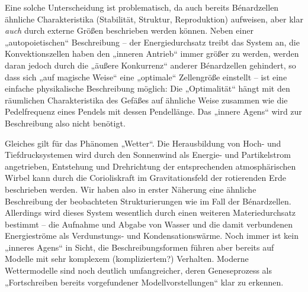 \documentclass[11pt,a4paper]{article}
\begin{document}
Eine solche Unterscheidung ist problematisch, da auch bereits
Bénardzellen ähnliche Charakteristika (Stabilität, Struktur,
Reproduktion) aufweisen, aber klar \emph{auch} durch externe Größen
beschrieben werden können. Neben einer „autopoietischen“ Beschreibung
-- der Energiedurchsatz treibt das System an, die Konvektionszellen haben
den „inneren Antrieb“ immer größer zu werden, werden daran jedoch
durch die „äußere Konkurrenz“ anderer Bénardzellen gehindert, so dass
sich „auf magische Weise“ eine „optimale“ Zellengröße einstellt --
ist eine einfache physikalische Beschreibung möglich: Die
„Optimalität“ hängt mit den räumlichen Charakteristika des Gefäßes auf
ähnliche Weise zusammen wie die Pedelfrequenz eines Pendels mit dessen
Pendellänge. Das „innere Agens“ wird zur Beschreibung also nicht
benötigt.

Gleiches gilt für das Phänomen „Wetter“. Die Herausbildung von Hoch- und
Tiefdrucksystemen wird durch den Sonnenwind als Energie- und Partikelstrom
angetrieben, Entstehung und Drehrichtung der entsprechenden atmosphärischen
Wirbel kann durch die Corioliskraft im Gravitationsfeld der rotierenden Erde
beschrieben werden. Wir haben also in erster Näherung eine ähnliche
Beschreibung der beobachteten Strukturierungen wie im Fall der
Bénardzellen. Allerdings wird dieses System wesentlich durch einen weiteren
Materiedurchsatz bestimmt -- die Aufnahme und Abgabe von Wasser und die damit
verbundenen Energieströme als Verdunstungs- und Kondensationswärme. Noch immer
ist kein „inneres Agens“ in Sicht, die Beschreibungsformen führen aber bereits
auf Modelle mit sehr komplexem (kompliziertem?) Verhalten. Moderne
Wettermodelle sind noch deutlich umfangreicher, deren Geneseprozess als
„Fortschreiben bereits vorgefundener Modellvorstellungen“ klar zu erkennen.
\end{document}
